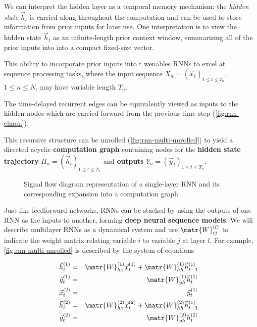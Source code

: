 We can interpret the hidden layer as a temporal memory mechanism: the \emph{hidden
state} $\vec{h}_t$ is carried along throughout the computation and can be used
to store information from prior inputs for later use. One interpretation is to view
the hidden state $\vec{h}_t$ as an infinite-length prior context window, summarizing
all of the prior inputs into into a compact fixed-size vector.

This ability to
incorporate prior inputs into t wenables RNNs to excel at
sequence processing tasks, where the input sequence $X_n = (\vec{x}_t)_{1 \leq
t \leq T_n}$, $1 \leq n \leq N$, may have variable length $T_n$.

The time-delayed recurrent edges can be equivalently viewed as inputs to the
hidden nodes which are carried forward from the previous time step
(\autoref{fig:rnn-elman}).


This recursive structure can be unrolled
(\autoref{fig:rnn-multi-unrolled}) to yield a directed acyclic
\textbf{computation graph} containing nodes for the
\textbf{hidden state trajectory} $H_n = (\vec{h}_t)_{1 \leq t \leq T_n}$ and
\textbf{outputs} $Y_n = (\vec{y}_t)_{1 \leq t \leq T_n}$.

\begin{figure}[htpb]
    \centering
    
    \caption{Signal flow diagram representation of a single-layer RNN and its corresponding
    expansion into a computation graph}
    \label{fig:rnn-single-unrolled}
\end{figure}

Just like feedforward networks, RNNs can be stacked by using the outputs of one
RNN as the inputs to another, forming \textbf{deep neural sequence models}. We
will describe multilayer RNNs as a dynamical system and use
$\matr{W}^{(l)}_{ij}$ to indicate the weight matrix relating variable $i$ to
variable $j$ at layer $l$. For example, \autoref{fig:rnn-multi-unrolled} is described
by the system of equations

\begin{eqnarray}
    \vec{h}^{(1)}_t &=& \matr{W}^{(1)}_{hx} \vec{x}^{(1)}_t + \matr{W}^{(1)}_{hh} \vec{h}^{(1)}_{t-1} \\
    \vec{y}^{(1)}_t &=& \matr{W}^{(1)}_{yh} \vec{h}^{(1)}_t \\
    \vec{x}^{(2)}_t &=& \vec{y}^{(1)}_t \\
    \vec{h}^{(2)}_t &=& \matr{W}^{(2)}_{hx} \vec{x}^{(2)}_t + \matr{W}^{(2)}_{hh} \vec{h}^{(1)}_{t-1} \\
    \vec{y}^{(2)}_t &=& \matr{W}^{(2)}_{yh} \vec{h}^{(2)}_t \\
\end{eqnarray}

